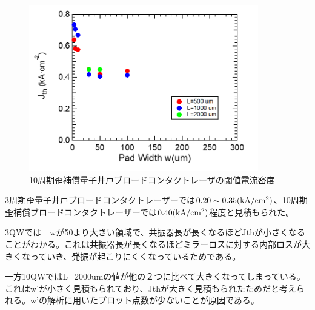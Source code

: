 \begin{figure}[h]
	\centering
	\includegraphics[width=10cm]{figure/fig_3_1_10QW_broadcontact_Jth.png}
		\caption{10周期歪補償量子井戸ブロードコンタクトレーザの閾値電流密度}
		\label{fig:fig_3_1_10QW_broadcontact_Jth}
\end{figure}
3周期歪量子井戸ブロードコンタクトレーザーでは$0.20\sim 0.35 \rm{(kA/cm^{2})}$、10周期歪補償ブロードコンタクトレーザーでは$0.40 \rm{(kA/cm^{2})}$程度と見積もられた。

3QWでは　wが50より大きい領域で、共振器長が長くなるほどJthが小さくなることがわかる。これは共振器長が長くなるほどミラーロスに対する内部ロスが大きくなっていき、発振が起こりにくくなっているためである。

一方10QWではL=2000umの値が他の２つに比べて大きくなってしまっている。これはw'が小さく見積もられており、Jthが大きく見積もられたためだと考えられる。w'の解析に用いたプロット点数が少ないことが原因である。
\clearpage
